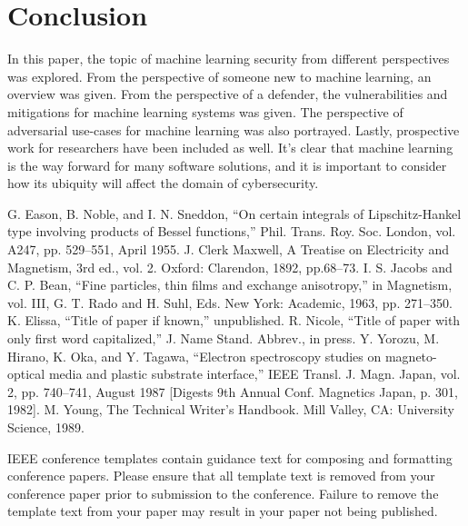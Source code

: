 \documentclass[11pt,conference]{IEEEtran}
\begin{document}
\section{Conclusion}
In this paper, the topic of machine learning security from different
perspectives was explored. From the perspective of someone new to machine
learning, an overview was given. From the perspective of a defender, the
vulnerabilities and mitigations for machine learning systems was given. The
perspective of adversarial use-cases for machine learning was also portrayed. Lastly,
prospective work for researchers have been included as well. It's clear that
machine learning is the way forward for many software solutions, and it is
important to consider how its ubiquity will affect the domain of cybersecurity. 


\begin{thebibliography}{00}
     G. Eason, B. Noble, and I. N. Sneddon, ``On certain integrals of Lipschitz-Hankel type involving products of Bessel functions,'' Phil. Trans. Roy. Soc. London, vol. A247, pp. 529--551, April 1955.
     J. Clerk Maxwell, A Treatise on Electricity and Magnetism, 3rd ed., vol. 2. Oxford: Clarendon, 1892, pp.68--73.
     I. S. Jacobs and C. P. Bean, ``Fine particles, thin films and exchange anisotropy,'' in Magnetism, vol. III, G. T. Rado and H. Suhl, Eds. New York: Academic, 1963, pp. 271--350.
     K. Elissa, ``Title of paper if known,'' unpublished.
     R. Nicole, ``Title of paper with only first word capitalized,'' J. Name Stand. Abbrev., in press.
     Y. Yorozu, M. Hirano, K. Oka, and Y. Tagawa, ``Electron spectroscopy studies on magneto-optical media and plastic substrate interface,'' IEEE Transl. J. Magn. Japan, vol. 2, pp. 740--741, August 1987 [Digests 9th Annual Conf. Magnetics Japan, p. 301, 1982].
     M. Young, The Technical Writer's Handbook. Mill Valley, CA: University Science, 1989.
\end{thebibliography}
\vspace{12pt}
\color{red}
IEEE conference templates contain guidance text for composing and formatting conference papers. Please ensure that all template text is removed from your conference paper prior to submission to the conference. Failure to remove the template text from your paper may result in your paper not being published.
\end{document}
